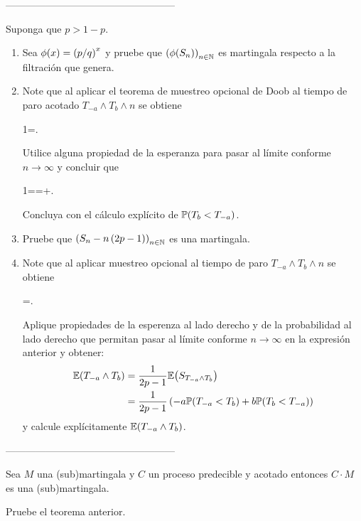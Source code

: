 \pn---------------------------------------------------\pn
\begin{ejercicio}
Suponga que $p>1-p$. 
\begin{enumerate}
\item Sea $\phi\!\left( x\right) =\left( p/q\right) ^x$ y pruebe que $\left( \phi\!\left( S_n\right) \right) _{n\in\mathbb{N}}$ es martingala respecto a la filtraci\'on que genera.
\item Note que al aplicar el teorema de muestreo opcional de Doob al tiempo de paro acotado $T_{-a}\wedge T_b\wedge n$ se obtiene\begin{esn}
1=.
\end{esn}Utilice alguna propiedad de la esperanza para pasar al l\'imite conforme $n\to\infty$ y concluir que\begin{esn}
1==+. 
\end{esn}Concluya con el c\'alculo expl\'icito de $\mathbb{P}\! \left( T_b<T_{-a} \right)$.
\item Pruebe que $\left( S_n-n\left( 2p-1\right) \right) _{n\in\mathbb{N}}$ es una martingala.
\item Note que al aplicar muestreo opcional al tiempo de paro $T_{-a}\wedge T_b\wedge n$ se obtiene\begin{esn}
=.
\end{esn}Aplique propiedades de la esperenza al lado derecho y de la probabilidad al lado derecho que permitan pasar al l\'imite conforme $n\to\infty$ en la expresi\'on anterior y obtener:
\begin{align*}
\mathbb{E}\! \left( T_{-a}\wedge T_b \right)&=\frac{1}{2p-1}\mathbb{E}\! \left( S_{T_{-a}\wedge T_b} \right)
\\&=\frac{1}{2p-1}\left( -a\mathbb{P}\! \left( T_{-a}<T_b \right)+b\mathbb{P}\! \left( T_b<T_{-a} \right)\right) 
\end{align*}y calcule expl\'icitamente $\mathbb{E}\! \left( T_{-a}\wedge T_b \right)$.
\end{enumerate}
\end{ejercicio}

\pn---------------------------------------------------\pn
\begin{teorema}
Sea $M$ una (sub)martingala y $C$ un proceso predecible y acotado entonces $C\cdot M$ es una (sub)martingala.
\end{teorema}
\begin{ejercicio}
Pruebe el teorema anterior. 
\end{ejercicio}

